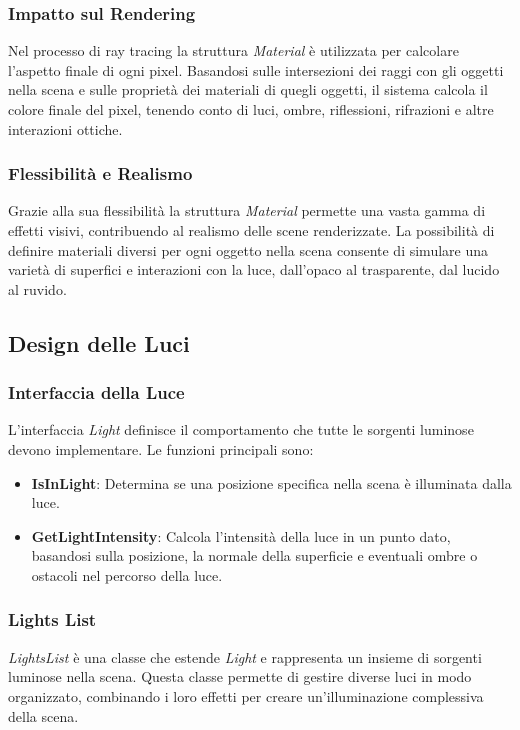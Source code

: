 \documentclass[12pt]{article}
\begin{document}
\subsubsection{Impatto sul Rendering}
Nel processo di ray tracing la struttura \textit{Material} è utilizzata per calcolare l'aspetto finale di ogni pixel. Basandosi sulle intersezioni dei raggi con gli oggetti nella scena e sulle proprietà dei materiali di quegli oggetti, il sistema calcola il colore finale del pixel, tenendo conto di luci, ombre, riflessioni, rifrazioni e altre interazioni ottiche.

\subsubsection{Flessibilità e Realismo}
Grazie alla sua flessibilità la struttura \textit{Material} permette una vasta gamma di effetti visivi, contribuendo al realismo delle scene renderizzate. La possibilità di definire materiali diversi per ogni oggetto nella scena consente di simulare una varietà di superfici e interazioni con la luce, dall'opaco al trasparente, dal lucido al ruvido.

\subsection{Design delle Luci}
\subsubsection{Interfaccia della Luce}
L'interfaccia \textit{Light} definisce il comportamento che tutte le sorgenti luminose devono implementare. Le funzioni principali sono:

\begin{itemize}
\item \textbf{IsInLight}: Determina se una posizione specifica nella scena è illuminata dalla luce.
\item \textbf{GetLightIntensity}: Calcola l'intensità della luce in un punto dato, basandosi sulla posizione, la normale della superficie e eventuali ombre o ostacoli nel percorso della luce.
\end{itemize}

\subsubsection{Lights List}
\textit{LightsList} è una classe che estende \textit{Light} e rappresenta un insieme di sorgenti luminose nella scena. Questa classe permette di gestire diverse luci in modo organizzato, combinando i loro effetti per creare un'illuminazione complessiva della scena.
\end{document}
